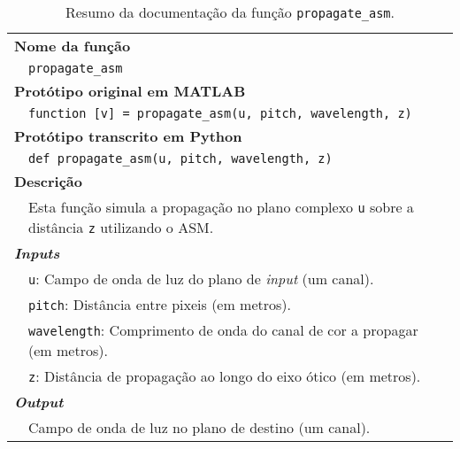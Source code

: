 \begin{table}[!htbp]
    \centering
    \caption{Resumo da documentação da função \texttt{propagate\_asm}.}
    \label{tab:propagate_asm}
    \begin{tabular}{p{1cm} p{10cm}}
        \hline
        \multicolumn{2}{l}{\bfseries Nome da função}\\
         & \verb|propagate_asm|\\
        \hline
        \multicolumn{2}{l}{\bfseries Protótipo original em MATLAB}\\
         & \texttt{function [v] = propagate_asm(u, pitch, wavelength, z)}\\
        \hline
        \multicolumn{2}{l}{\bfseries Protótipo transcrito em Python}\\
         & \texttt{def propagate_asm(u, pitch, wavelength, z)} \\
        \hline\multicolumn{2}{l}{\bfseries Descrição}\\
         & Esta função simula a propagação no plano complexo \verb|u| sobre a distância \verb|z| utilizando o \ac{ASM}.\\
        \hline\multicolumn{2}{l}{\bfseries \textit{Inputs}}\\
         & \verb|u|: Campo de onda de luz do plano de \textit{input} (um canal).\\
         & \verb|pitch|: Distância entre pixeis (em metros).\\
         & \verb|wavelength|: Comprimento de onda do canal de cor a propagar (em metros).\\
         & \verb|z|: Distância de propagação ao longo do eixo ótico (em metros).\\
        \hline\multicolumn{2}{l}{\bfseries \textit{Output}}\\
         & Campo de onda de luz no plano de destino (um canal).\\
        \hline
    \end{tabular}
\end{table}


